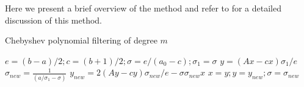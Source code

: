 \documentclass[10pt,a4paper, nocenter]{article}
\begin{document}
	Here we present a brief overview of the method and refer to \cite{chebydav07} for a detailed discussion of this method.  
    \begin{algorithm}
    	\label{alg:chebyshev_filter}
    	\caption{Chebyshev polynomial filtering of degree $m$}
    	\begin{algorithmic}[1]
    		\State $e=(b-a)/2; c=(b+1)/2; \sigma = e/(a_0 -c); \sigma_1 = \sigma$
    		\State $y=(Ax-cx)\sigma_1/e$
    			\State$\sigma_{new} = \frac{1}{(a/\sigma_1-\sigma)}$
    			\State$y_{new} = 2(Ay-cy)\sigma_{new}/e - \sigma \sigma_{new}x$
    			\State$x=y; y=y_{new}; \sigma = \sigma_{new}$
    		\EndFor

    		\State {}
    		\EndFunction
    	\end{algorithmic}
    \end{algorithm}
\end{document}
